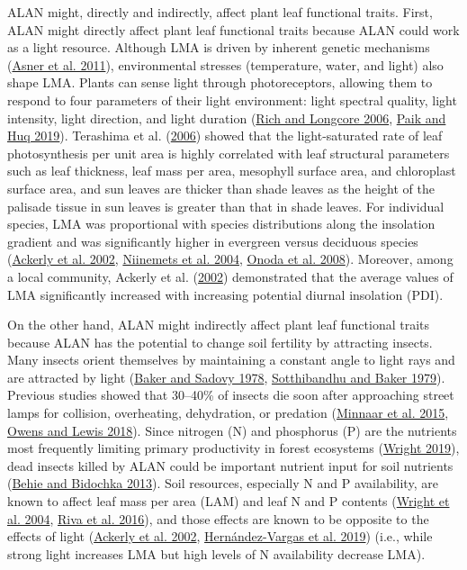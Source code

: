 \documentclass[
  12pt,
  letterpaper,
  DIV=11,
  numbers=noendperiod]{scrartcl}
\begin{document}
ALAN might, directly and indirectly, affect plant leaf functional
traits. First, ALAN might directly affect plant leaf functional traits
because ALAN could work as a light resource. Although LMA is driven by
inherent genetic mechanisms (\protect\hyperlink{ref-Asner2011}{Asner et
al. 2011}), environmental stresses (temperature, water, and light) also
shape LMA. Plants can sense light through photoreceptors, allowing them
to respond to four parameters of their light environment: light spectral
quality, light intensity, light direction, and light duration
(\protect\hyperlink{ref-Rich2006}{Rich and Longcore 2006},
\protect\hyperlink{ref-Paik2019}{Paik and Huq 2019}). Terashima et al.
(\protect\hyperlink{ref-Terashima2006}{2006}) showed that the
light-saturated rate of leaf photosynthesis per unit area is highly
correlated with leaf structural parameters such as leaf thickness, leaf
mass per area, mesophyll surface area, and chloroplast surface area, and
sun leaves are thicker than shade leaves as the height of the palisade
tissue in sun leaves is greater than that in shade leaves. For
individual species, LMA was proportional with species distributions
along the insolation gradient and was significantly higher in evergreen
versus deciduous species (\protect\hyperlink{ref-Ackerly2002}{Ackerly et
al. 2002}, \protect\hyperlink{ref-Niinemets2004}{Niinemets et al. 2004},
\protect\hyperlink{ref-Onoda2008}{Onoda et al. 2008}). Moreover, among a
local community, Ackerly et al.
(\protect\hyperlink{ref-Ackerly2002}{2002}) demonstrated that the
average values of LMA significantly increased with increasing potential
diurnal insolation (PDI).

On the other hand, ALAN might indirectly affect plant leaf functional
traits because ALAN has the potential to change soil fertility by
attracting insects. Many insects orient themselves by maintaining a
constant angle to light rays and are attracted by light
(\protect\hyperlink{ref-Baker1978}{Baker and Sadovy 1978},
\protect\hyperlink{ref-Sotthibandhu1979}{Sotthibandhu and Baker 1979}).
Previous studies showed that 30--40\% of insects die soon after
approaching street lamps for collision, overheating, dehydration, or
predation (\protect\hyperlink{ref-Minnaar2015}{Minnaar et al. 2015},
\protect\hyperlink{ref-Owens2018}{Owens and Lewis 2018}). Since nitrogen
(N) and phosphorus (P) are the nutrients most frequently limiting
primary productivity in forest ecosystems
(\protect\hyperlink{ref-Wright2019}{Wright 2019}), dead insects killed
by ALAN could be important nutrient input for soil nutrients
(\protect\hyperlink{ref-Behie2013}{Behie and Bidochka 2013}). Soil
resources, especially N and P availability, are known to affect leaf
mass per area (LAM) and leaf N and P contents
(\protect\hyperlink{ref-Wright2004}{Wright et al. 2004},
\protect\hyperlink{ref-Riva2016}{Riva et al. 2016}), and those effects
are known to be opposite to the effects of light
(\protect\hyperlink{ref-Ackerly2002}{Ackerly et al. 2002},
\protect\hyperlink{ref-Hernandez-Vargas2019}{Hernández-Vargas et al.
2019}) (i.e., while strong light increases LMA but high levels of N
availability decrease LMA).
\end{document}
